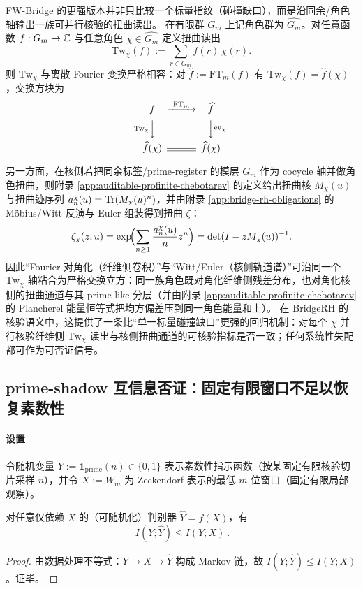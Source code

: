 FW-Bridge 的更强版本并非只比较一个标量指纹（碰撞缺口），而是沿同余/角色轴输出一族可并行核验的扭曲读出。
在有限群 \(G_m\) 上记角色群为 \(\widehat{G_m}\)。对任意函数 \(f:G_m\to\mathbb{C}\) 与任意角色 \(\chi\in\widehat{G_m}\) 定义扭曲读出
$$
\mathrm{Tw}_\chi(f):=\sum_{r\in G_m} f(r)\,\chi(r).
$$
则 \(\mathrm{Tw}_\chi\) 与离散 Fourier 变换严格相容：对 \(\widehat f:=\mathrm{FT}_m(f)\) 有 \(\mathrm{Tw}_\chi(f)=\widehat f(\chi)\)，交换方块为
$$
\begin{CD}
f @>\mathrm{FT}_m>> \widehat f \\
@V\mathrm{Tw}_\chi VV @VV\mathrm{ev}_\chi V \\
\widehat f(\chi) @= \widehat f(\chi)
\end{CD}
$$

另一方面，在核侧若把同余标签/prime-register 的模层 \(G_m\) 作为 cocycle 轴并做角色扭曲，则附录 \ref{app:auditable-profinite-chebotarev} 的定义给出扭曲核 \(M_\chi(u)\) 与扭曲迹序列 \(a_n^\chi(u)=\mathrm{Tr}(M_\chi(u)^n)\)，并由附录 \ref{app:bridge-rh-obligations} 的 Möbius/Witt 反演与 Euler 组装得到扭曲 \(\zeta\)：
$$
\zeta_\chi(z,u)=\exp\!\Bigl(\sum_{n\ge 1}\frac{a_n^\chi(u)}{n}z^n\Bigr)=\det(I-zM_\chi(u))^{-1}.
$$
因此“Fourier 对角化（纤维侧卷积）”与“Witt/Euler（核侧轨道谱）”可沿同一个 \(\mathrm{Tw}_\chi\) 轴粘合为严格交换立方：同一族角色既对角化纤维侧残差分布，也对角化核侧的扭曲通道与其 prime-like 分层（并由附录 \ref{app:auditable-profinite-chebotarev} 的 Plancherel 能量恒等式把均方偏差压到同一角色能量和上）。
在 BridgeRH 的核验语义中，这提供了一条比“单一标量碰撞缺口”更强的回归机制：对每个 \(\chi\) 并行核验纤维侧 \(\mathrm{Tw}_\chi\) 读出与核侧扭曲通道的可核验指标是否一致；任何系统性失配都可作为可否证信号。

\subsection{prime-shadow 互信息否证：固定有限窗口不足以恢复素数性}\label{subsec:prime-shadow-mi}

\paragraph{设置}
令随机变量 \(Y:=\mathbf{1}_{\mathrm{prime}}(n)\in\{0,1\}\) 表示素数性指示函数（按某固定有限核验切片采样 \(n\)），并令 \(X:=W_m\) 为 Zeckendorf 表示的最低 \(m\) 位窗口（固定有限局部观察）。

\begin{proposition}[数据处理不等式给出的信息上界]\label{prop:prime-shadow-mi-dpi}
对任意仅依赖 \(X\) 的（可随机化）判别器 \(\widehat Y=f(X)\)，有
$$
\boxed{\ I(Y;\widehat Y)\le I(Y;X)\ }.
$$
\end{proposition}
\begin{proof}
由数据处理不等式：\(Y\to X\to \widehat Y\) 构成 Markov 链，故 \(I(Y;\widehat Y)\le I(Y;X)\)。证毕。
\end{proof}

